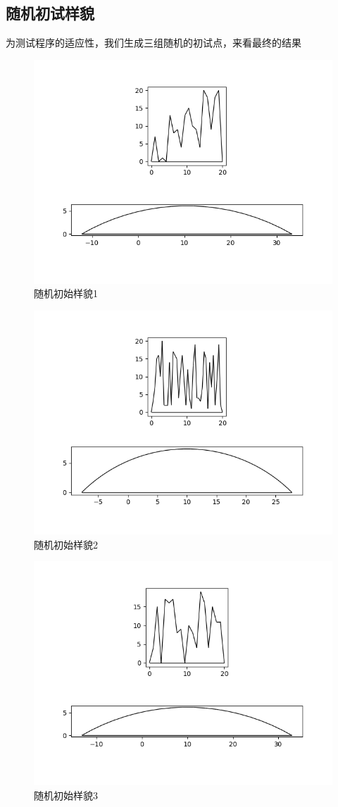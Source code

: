 \documentclass[12pt,oneside,a4paper]{article}
\begin{document}
\subsection{随机初试样貌}
为测试程序的适应性，我们生成三组随机的初试点，来看最终的结果
\begin{figure}[H]
	\centering
	\includegraphics[width=0.7\linewidth]{figure/ran1.png}
	\caption{随机初始样貌1}
\end{figure}
\begin{figure}[H]
	\centering
	\includegraphics[width=0.7\linewidth]{figure/ran2.png}
	\caption{随机初始样貌2}
\end{figure}
\begin{figure}[H]
	\centering
	\includegraphics[width=0.7\linewidth]{figure/ran3.png}
	\caption{随机初始样貌3}
\end{figure}
\end{document}
